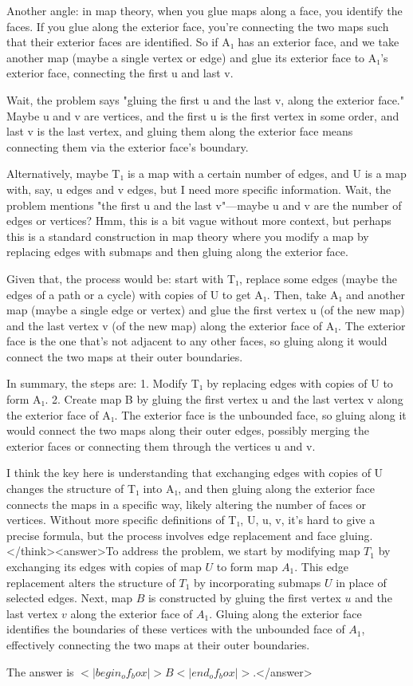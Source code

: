 Another angle: in map theory, when you glue maps along a face, you identify the faces. If you glue along the exterior face, you're connecting the two maps such that their exterior faces are identified. So if A₁ has an exterior face, and we take another map (maybe a single vertex or edge) and glue its exterior face to A₁'s exterior face, connecting the first u and last v. 

Wait, the problem says "gluing the first u and the last v, along the exterior face." Maybe u and v are vertices, and the first u is the first vertex in some order, and last v is the last vertex, and gluing them along the exterior face means connecting them via the exterior face's boundary. 

Alternatively, maybe T₁ is a map with a certain number of edges, and U is a map with, say, u edges and v edges, but I need more specific information. Wait, the problem mentions "the first u and the last v"—maybe u and v are the number of edges or vertices? Hmm, this is a bit vague without more context, but perhaps this is a standard construction in map theory where you modify a map by replacing edges with submaps and then gluing along the exterior face.

Given that, the process would be: start with T₁, replace some edges (maybe the edges of a path or a cycle) with copies of U to get A₁. Then, take A₁ and another map (maybe a single edge or vertex) and glue the first vertex u (of the new map) and the last vertex v (of the new map) along the exterior face of A₁. The exterior face is the one that's not adjacent to any other faces, so gluing along it would connect the two maps at their outer boundaries.

In summary, the steps are: 1. Modify T₁ by replacing edges with copies of U to form A₁. 2. Create map B by gluing the first vertex u and the last vertex v along the exterior face of A₁. The exterior face is the unbounded face, so gluing along it would connect the two maps along their outer edges, possibly merging the exterior faces or connecting them through the vertices u and v.

I think the key here is understanding that exchanging edges with copies of U changes the structure of T₁ into A₁, and then gluing along the exterior face connects the maps in a specific way, likely altering the number of faces or vertices. Without more specific definitions of T₁, U, u, v, it's hard to give a precise formula, but the process involves edge replacement and face gluing.</think><answer>To address the problem, we start by modifying map \( T_1 \) by exchanging its edges with copies of map \( U \) to form map \( A_1 \). This edge replacement alters the structure of \( T_1 \) by incorporating submaps \( U \) in place of selected edges. Next, map \( B \) is constructed by gluing the first vertex \( u \) and the last vertex \( v \) along the exterior face of \( A_1 \). Gluing along the exterior face identifies the boundaries of these vertices with the unbounded face of \( A_1 \), effectively connecting the two maps at their outer boundaries.  

The answer is \(<|begin_of_box|>B<|end_of_box|>\).</answer>